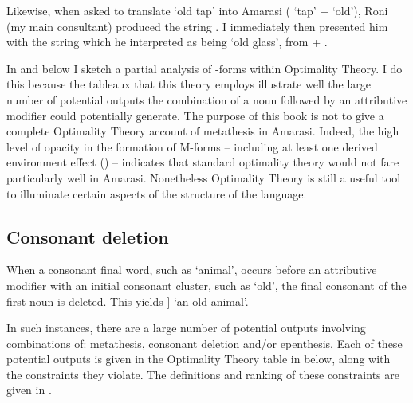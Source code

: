 Likewise, when asked to translate `old tap' into Amarasi ( `tap' +  `old'),
Roni (my main consultant) produced the string .
I immediately then presented him with the string 
which he interpreted as being `old glass', from  + .

In  and  below I sketch
a partial analysis of {\MC}-forms within Optimality Theory.
I do this because the tableaux that this theory employs
illustrate well the large number of potential outputs
the combination of a noun followed by an attributive
modifier could potentially generate.
The purpose of this book is not to give a
complete Optimality Theory account of metathesis in Amarasi.
Indeed, the high level of opacity in the formation of M-forms
-- including at least one derived environment effect () --
indicates that standard optimality theory
would not fare particularly well in Amarasi.
Nonetheless Optimality Theory is still a useful tool
to illuminate certain aspects of the structure of the language.

\subsection{Consonant deletion}\label{sec:ConDel/CC}
When a consonant final word, such as  `animal',
occurs before an attributive modifier
with an initial consonant cluster, such as  `old',
the final consonant of the first noun is deleted.
This yields   ] `an old animal'.

In such instances, there are a large number of potential
outputs involving combinations of: metathesis, consonant deletion and/or epenthesis.
Each of these potential outputs is given in the Optimality Theory
table in  below, along with the constraints they violate.
The definitions and ranking of these constraints are given in .

\begin{exe}
	\label{ex:Constraints}
\end{exe}


